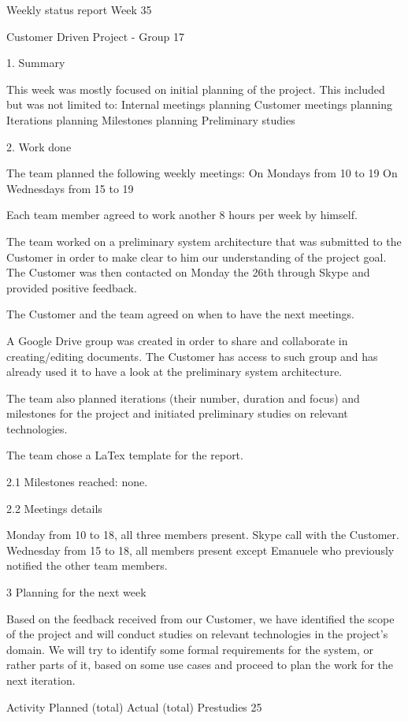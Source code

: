 Weekly status report
Week 35

Customer Driven Project - Group 17

1. Summary

This week was mostly focused on initial planning of the project.
This included but was not limited to:
Internal meetings planning
Customer meetings planning
Iterations planning
Milestones planning
Preliminary studies

2. Work done

The team planned the following weekly meetings:
On Mondays from 10 to 19
On Wednesdays from 15 to 19

Each team member agreed to work another 8 hours per week by himself.

The team worked on a preliminary system architecture that was submitted
to the Customer in order to make clear to him our understanding of the project goal. The Customer was then contacted on Monday the 26th through Skype and provided positive feedback.

The Customer and the team agreed on when to have the next meetings.

A Google Drive group was created in order to share and collaborate in creating/editing documents. The Customer has access to such group and has already used it to have a look at the preliminary system architecture.

The team also planned iterations (their number, duration and focus) and milestones for the project and initiated preliminary studies on relevant technologies.

The team chose a LaTex template for the report.


2.1 Milestones reached: none.


2.2 Meetings details

Monday
from 10 to 18, all three members present. Skype call with the Customer.
Wednesday
from 15 to 18, all members present except Emanuele who previously notified the other team members.

3 Planning for the next week

Based on the feedback received from our Customer, we have identified the scope of the project and will conduct studies on relevant technologies in the project’s domain. We will try to identify some formal requirements
for the system, or rather parts of it, based on some use cases and proceed to plan the work for the next iteration.

Activity
Planned (total)
Actual (total)
Prestudies
25

